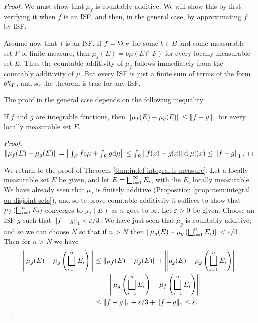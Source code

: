 \begin{proof}

We must show that $\mu_f$ is countably additive. We will show this by first verifying it when $f$ is an ISF, and then, in the general case, by approximating $f$ by ISF.

Assume now that $f$ is an ISF. If $f=b\idf{F}$ for some $b\in B$ and some measurable set $F$ of finite measure, then $\mu_f(E)=b\mu(E\cap F)$ for every locally measurable set $E$. Thus the countable additivity of $\mu_f$ follows immediately from the countably additivity of $\mu$. But every ISF is just a finite sum of terms of the form $b\idf{F}$, and so the theorem is true for any ISF.

The proof in the general case depends on the following inequality:

\begin{lemma}
If $f$ and $g$ are integrable functions, then $\norm{\mu_f(E)-\mu_g(E)}\leq\norm{f-g}_1$ for every locally measurable set $E$.
\end{lemma}

\begin{proof}
$\norm{\mu_f(E)-\mu_g(E)}=\norm{\int_Ef\dd\mu+\int_Eg\dd\mu}\leq\int_E\norm{f(x)-g(x)}\dd|\mu|(x)\allowbreak\leq\norm{f-g}_1$.
\end{proof}

We return to the proof of Theorem \ref{thm:indef integral is measure}. Let a locally measurable set $E$ be given, and let $E=\bigsqcup_{i=1}^\infty E_i$, with the $E_i$ locally measurable. We have already seen that $\mu_f$ is finitely additive (Proposition \ref{prop:item:integral on disjoint sets}), and so to prove countable additivity it suffices to show that $\mu_f\left(\bigsqcup_{i=1}^n E_i\right)$ converges to $\mu_f(E)$ as $n$ goes to $\infty$. Let $\varepsilon>0$ be given. Choose an ISF $g$ such that $\norm{f-g}_1<\varepsilon/3$. We have just seen that $\mu_g$ is countably additive, and so we can choose $N$ so that if $n>N$ then $\norm{\mu_g(E)-\mu_g\left(\bigsqcup_{i=1}^nE_i\right)}<\varepsilon/3$. Then for $n>N$ we have
\begin{align*} %
    \norm{\mu_g(E)-\mu_g\br{\bigdu_{i=1}^nE_i}}&\leq\norm{\mu_f(E)-\mu_g(E)}+\norm{\mu_g(E)-\mu_g\br{\bigdu_{i=1}^nE_i}}\\
    &\quad+\norm{\mu_g\br{\bigdu_{i=1}^nE_i}-\mu_f\br{\bigdu_{i=1}^nE_i}}\\
    &\leq\norm{f-g}_1+\ep/3+\norm{f-g}_1\leq\ep.
\end{align*}
\end{proof}

